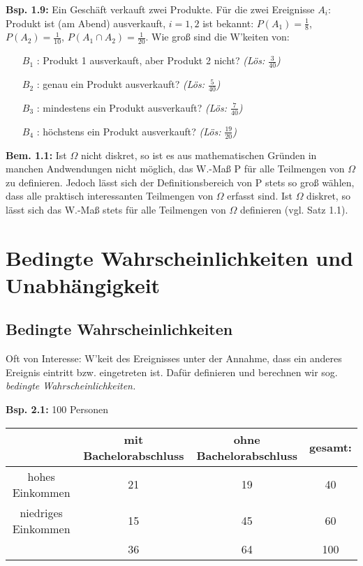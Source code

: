 \documentclass[a4paper,11pt]{article}
\begin{document}
\vspace{6pt}
\noindent\textbf{Bsp. 1.9:} Ein Geschäft verkauft zwei Produkte. Für die zwei Ereignisse $A_i$: \glqq Produkt ist (am Abend) ausverkauft\grqq, $i=1,2$ ist bekannt: $P(A_1) = \frac{1}{8}$, $P(A_2) = \frac{1}{10}$, $P(A_1 \cap A_2) = \frac{1}{20}$.
Wie groß sind die W'keiten von:
\begin{itemize}
    \item[$B_1$]: \glqq Produkt 1 ausverkauft, aber Produkt 2 nicht\grqq?    \textit{(Lös: $\frac{3}{40}$)}
    \item[$B_2$]: \glqq genau ein Produkt ausverkauft\grqq?    \textit{(Lös: $\frac{5}{40}$)}
    \item[$B_3$]: \glqq mindestens ein Produkt ausverkauft\grqq?    \textit{(Lös: $\frac{7}{40}$)}
    \item[$B_4$]: \glqq höchstens ein Produkt ausverkauft\grqq?    \textit{(Lös: $\frac{19}{20}$)}
\end{itemize}

\vspace{6pt}
\noindent\textbf{Bem. 1.1:} Ist $\Omega$ nicht diskret, so ist es aus mathematischen Gründen in manchen Andwendungen nicht möglich, das W.-Maß P für alle Teilmengen von $\Omega$ zu definieren. 
\newline Jedoch lässt sich der Definitionsbereich von P stets so groß wählen, dass alle praktisch interessanten Teilmengen von $\Omega$ erfasst sind. 
Ist $\Omega$ diskret, so lässt sich das W.-Maß stets für alle Teilmengen von $\Omega$ definieren (vgl. Satz 1.1).

\section{Bedingte Wahrscheinlichkeiten und Unabhängigkeit}

\subsection{Bedingte Wahrscheinlichkeiten}

Oft von Interesse: W'keit des Ereignisses unter der Annahme, dass ein anderes Ereignis eintritt bzw. eingetreten ist. 
Dafür definieren und berechnen wir sog. \textit{bedingte Wahrscheinlichkeiten.}

\vspace{6pt}
\noindent\textbf{Bsp. 2.1:} 100 Personen
\newline\noindent
\begin{tabular}{c|c|c|c}
& mit Bachelorabschluss & ohne Bachelorabschluss & gesamt:\\
\hline
hohes Einkommen & 21 & 19 & 40\\
\hline
niedriges Einkommen & 15 & 45 & 60\\
\hline
& 36 & 64 & 100\\
\end{tabular}
\end{document}
